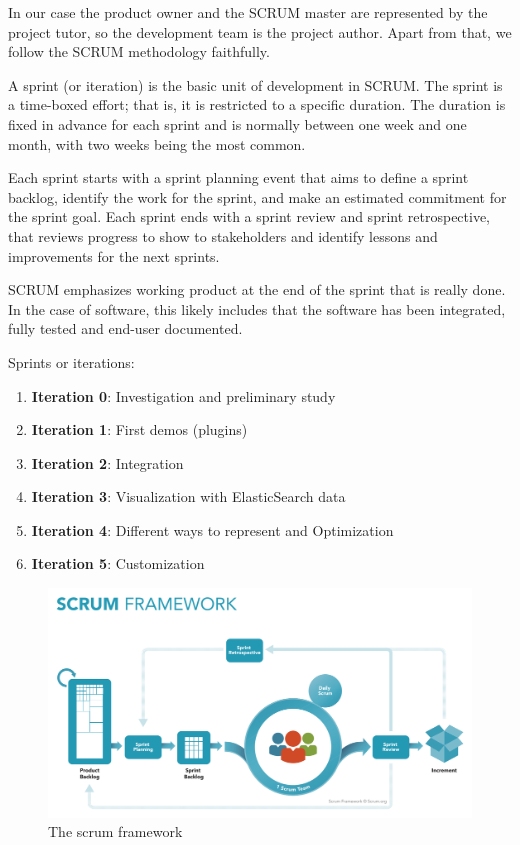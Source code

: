 \documentclass[a4paper, 12pt]{book}
\begin{document}
In our case the product owner and the SCRUM master are represented by the project tutor, so the development team is the project author. Apart from that, we follow the SCRUM methodology faithfully.

A sprint (or iteration) is the basic unit of development in SCRUM. The sprint is a time-boxed effort; that is, it is restricted to a specific duration. The duration is fixed in advance for each sprint and is normally between one week and one month, with two weeks being the most common.

Each sprint starts with a sprint planning event that aims to define a sprint backlog, identify the work for the sprint, and make an estimated commitment for the sprint goal. Each sprint ends with a sprint review and sprint retrospective, that reviews progress to show to stakeholders and identify lessons and improvements for the next sprints.

SCRUM emphasizes working product at the end of the sprint that is really done. In the case of software, this likely includes that the software has been integrated, fully tested and end-user documented.

Sprints or iterations:
\begin{enumerate}
\item \textbf{Iteration 0}: Investigation and preliminary study
\item \textbf{Iteration 1}: First demos (plugins)
\item \textbf{Iteration 2}: Integration
\item \textbf{Iteration 3}: Visualization with ElasticSearch data
\item \textbf{Iteration 4}: Different ways to represent and Optimization
\item \textbf{Iteration 5}: Customization
\end{enumerate}

\begin{figure}[!htb]
  \centering
  \includegraphics[width=15cm, keepaspectratio]{img/development/SCRUM}
  \caption{The scrum framework}
  \label{fig:scrum}
\end{figure}
\end{document}
